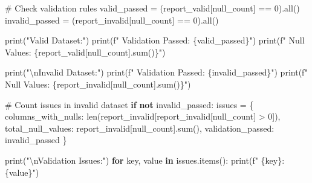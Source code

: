 \documentclass[
  letterpaper,
]{scrbook}
\newenvironment{Shaded}{\begin{snugshade}}{\end{snugshade}}
\newcommand{\BuiltInTok}[1]{\textcolor[rgb]{0.00,0.23,0.31}{#1}}
\newcommand{\CharTok}[1]{\textcolor[rgb]{0.13,0.47,0.30}{#1}}
\newcommand{\CommentTok}[1]{\textcolor[rgb]{0.37,0.37,0.37}{#1}}
\newcommand{\ControlFlowTok}[1]{\textcolor[rgb]{0.00,0.23,0.31}{\textbf{#1}}}
\newcommand{\DecValTok}[1]{\textcolor[rgb]{0.68,0.00,0.00}{#1}}
\newcommand{\KeywordTok}[1]{\textcolor[rgb]{0.00,0.23,0.31}{\textbf{#1}}}
\newcommand{\NormalTok}[1]{\textcolor[rgb]{0.00,0.23,0.31}{#1}}
\newcommand{\OperatorTok}[1]{\textcolor[rgb]{0.37,0.37,0.37}{#1}}
\newcommand{\SpecialCharTok}[1]{\textcolor[rgb]{0.37,0.37,0.37}{#1}}
\newcommand{\SpecialStringTok}[1]{\textcolor[rgb]{0.13,0.47,0.30}{#1}}
\newcommand{\StringTok}[1]{\textcolor[rgb]{0.13,0.47,0.30}{#1}}
\begin{document}
\begin{Shaded}
\begin{Highlighting}[]
\CommentTok{\# Check validation rules}
\NormalTok{valid\_passed }\OperatorTok{=}\NormalTok{ (report\_valid[}\StringTok{\textquotesingle{}null\_count\textquotesingle{}}\NormalTok{] }\OperatorTok{==} \DecValTok{0}\NormalTok{).}\BuiltInTok{all}\NormalTok{()}
\NormalTok{invalid\_passed }\OperatorTok{=}\NormalTok{ (report\_invalid[}\StringTok{\textquotesingle{}null\_count\textquotesingle{}}\NormalTok{] }\OperatorTok{==} \DecValTok{0}\NormalTok{).}\BuiltInTok{all}\NormalTok{()}

\BuiltInTok{print}\NormalTok{(}\StringTok{"Valid Dataset:"}\NormalTok{)}
\BuiltInTok{print}\NormalTok{(}\SpecialStringTok{f"  Validation Passed: }\SpecialCharTok{\{}\NormalTok{valid\_passed}\SpecialCharTok{\}}\SpecialStringTok{"}\NormalTok{)}
\BuiltInTok{print}\NormalTok{(}\SpecialStringTok{f"  Null Values: }\SpecialCharTok{\{}\NormalTok{report\_valid[}\StringTok{\textquotesingle{}null\_count\textquotesingle{}}\NormalTok{]}\SpecialCharTok{.}\BuiltInTok{sum}\NormalTok{()}\SpecialCharTok{\}}\SpecialStringTok{"}\NormalTok{)}

\BuiltInTok{print}\NormalTok{(}\StringTok{"}\CharTok{\textbackslash{}n}\StringTok{Invalid Dataset:"}\NormalTok{)}
\BuiltInTok{print}\NormalTok{(}\SpecialStringTok{f"  Validation Passed: }\SpecialCharTok{\{}\NormalTok{invalid\_passed}\SpecialCharTok{\}}\SpecialStringTok{"}\NormalTok{)}
\BuiltInTok{print}\NormalTok{(}\SpecialStringTok{f"  Null Values: }\SpecialCharTok{\{}\NormalTok{report\_invalid[}\StringTok{\textquotesingle{}null\_count\textquotesingle{}}\NormalTok{]}\SpecialCharTok{.}\BuiltInTok{sum}\NormalTok{()}\SpecialCharTok{\}}\SpecialStringTok{"}\NormalTok{)}

\CommentTok{\# Count issues in invalid dataset}
\ControlFlowTok{if} \KeywordTok{not}\NormalTok{ invalid\_passed:}
\NormalTok{    issues }\OperatorTok{=}\NormalTok{ \{}
        \StringTok{\textquotesingle{}columns\_with\_nulls\textquotesingle{}}\NormalTok{: }\BuiltInTok{len}\NormalTok{(report\_invalid[report\_invalid[}\StringTok{\textquotesingle{}null\_count\textquotesingle{}}\NormalTok{] }\OperatorTok{\textgreater{}} \DecValTok{0}\NormalTok{]),}
        \StringTok{\textquotesingle{}total\_null\_values\textquotesingle{}}\NormalTok{: report\_invalid[}\StringTok{\textquotesingle{}null\_count\textquotesingle{}}\NormalTok{].}\BuiltInTok{sum}\NormalTok{(),}
        \StringTok{\textquotesingle{}validation\_passed\textquotesingle{}}\NormalTok{: invalid\_passed}
\NormalTok{    \}}
    
    \BuiltInTok{print}\NormalTok{(}\StringTok{"}\CharTok{\textbackslash{}n}\StringTok{Validation Issues:"}\NormalTok{)}
    \ControlFlowTok{for}\NormalTok{ key, value }\KeywordTok{in}\NormalTok{ issues.items():}
        \BuiltInTok{print}\NormalTok{(}\SpecialStringTok{f"  }\SpecialCharTok{\{}\NormalTok{key}\SpecialCharTok{\}}\SpecialStringTok{: }\SpecialCharTok{\{}\NormalTok{value}\SpecialCharTok{\}}\SpecialStringTok{"}\NormalTok{)}
    

\end{Highlighting}
\end{Shaded}
\end{document}
